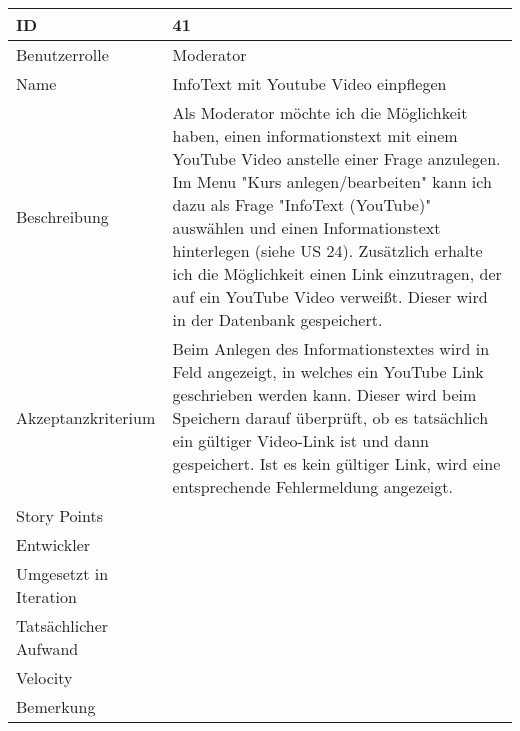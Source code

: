 \begin{tabularx}{\textwidth}{|p{}|X|}
	\hline
	ID & 41\\
	\hline
	Benutzerrolle & Moderator\\
	\hline
	Name & InfoText mit Youtube Video einpflegen\\
	\hline
	Beschreibung & Als Moderator möchte ich die Möglichkeit haben, einen informationstext mit einem YouTube Video anstelle einer Frage anzulegen. Im Menu "Kurs anlegen/bearbeiten" kann ich dazu als Frage "InfoText (YouTube)" auswählen und einen Informationstext hinterlegen (siehe US 24). Zusätzlich erhalte ich die Möglichkeit einen Link einzutragen, der auf ein YouTube Video verweißt. Dieser wird in der Datenbank gespeichert.\\
	\hline
	Akzeptanzkriterium & Beim Anlegen des Informationstextes wird in Feld angezeigt, in welches ein YouTube Link geschrieben werden kann. Dieser wird beim Speichern darauf überprüft, ob es tatsächlich ein gültiger Video-Link ist und dann gespeichert. Ist es kein gültiger Link, wird eine entsprechende Fehlermeldung angezeigt. \\
	\hline
	Story Points & \\
	\hline
	Entwickler & \\
	\hline
	Umgesetzt in Iteration & \\
	\hline
	Tatsächlicher Aufwand & \\
	\hline
	Velocity & \\
	\hline
	Bemerkung & \\
	\hline
\end{tabularx}
\vspace{20pt}
